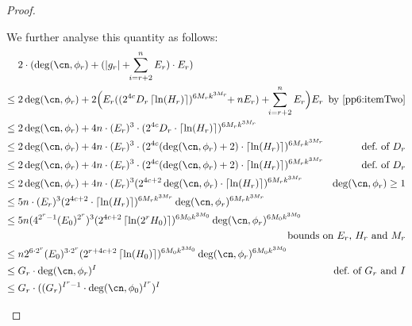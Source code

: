 \begin{proof}
\begin{claimproof}
\begin{description}
        We further analyse this quantity as follows:
        \begin{align*}
          & 2 \cdot (\deg(\cn,\phi_r) + (\abs{g_r} +\!\!\sum_{i = r+2}^n E_r) \cdot E_r)\\
          \leq{}& 
            2\deg(\cn,\phi_r) + 
            2\Big(E_r ((2^{4c} D_r \ceil{\ln(H_r)})^{6 M_r k^{3M_r}}\!\!+n E_r)
            +\!\!\sum_{i = r+2}^n E_r\Big) E_r 
            &\hspace{-0.2cm}\text{by~\Cref{pp6:itemTwo}}\\
          \leq{}& 
            2\deg(\cn,\phi_r) + 
            4n \cdot (E_r)^3 \cdot (2^{4c} D_r \cdot \ceil{\ln(H_r)})^{6 M_r k^{3M_r}}
          \\
          \leq{}& 
            2\deg(\cn,\phi_r) + 
            4n \cdot (E_r)^3 \cdot (2^{4c} (\deg(\cn,\phi_r)+2) \cdot \ceil{\ln(H_r)})^{6 M_r k^{3M_r}}
          &\hspace{-0.2cm}\text{def.~of~$D_r$}
          \\
          \leq{}& 
            2 \deg(\cn,\phi_r) + 
            4n \cdot (E_r)^3 \cdot (2^{4c} (\deg(\cn,\phi_r)+2) \cdot \ceil{\ln(H_r)})^{6 M_r k^{3M_r}}
          &\hspace{-0.2cm}\text{def.~of~$D_r$}\\
          \leq{}& 
            2\deg(\cn,\phi_r) + 
            4n \cdot (E_r)^3 (2^{4c+2} \deg(\cn,\phi_r) \cdot \ceil{\ln(H_r)})^{6 M_r k^{3M_r}}
          &\hspace{-0.5cm}\text{$\deg(\cn,\phi_r) \geq 1$}\\
          \leq{}& 
            5n \cdot (E_r)^3 (2^{4c+2} \cdot \ceil{\ln(H_r)})^{6 M_r k^{3M_r}} \deg(\cn,\phi_r)^{6 M_r k^{3M_r}}
          \\
          \leq{}& 
            5n (4^{2^r-1}(E_0)^{2^r})^3 (2^{4c+2} \ceil{\ln(2^r H_0)})^{6 M_0 k^{3M_0}} \deg(\cn,\phi_r)^{6 M_0 k^{3M_0}}
          \\
          &&\hspace{-2.5cm}\text{bounds on $E_r$, $H_r$ and $M_r$}\\
          \leq{}& 
            n 2^{6 \cdot 2^r}(E_0)^{3 \cdot 2^r} (2^{r+4c+2} \ceil{\ln(H_0)})^{6 M_0 k^{3M_0}} \deg(\cn,\phi_r)^{6 M_0 k^{3M_0}}
          \\
          \leq{}& 
          G_r \cdot \deg(\cn,\phi_r)^{I}
          &\hspace{-1cm}\text{def.~of~$G_r$ and $I$}
          \\
          \leq{}& 
          G_r \cdot ((G_r)^{I^r-1} \cdot \deg(\cn,\phi_0)^{I^r})^{I}

\end{align*}
\end{description}
\end{claimproof}
\end{proof}
